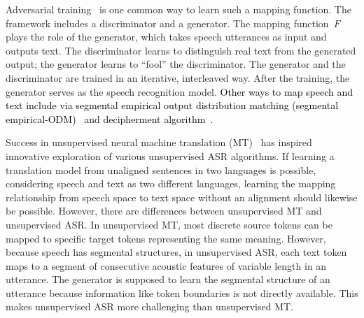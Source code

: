Adversarial training~\cite{goodfellow_generative_2014,arjovsky_wasserstein_2017, gulrajani_improved_2017} is one common way to learn such a 
mapping function. 
The framework includes a discriminator and a generator.
The mapping function~$F$ plays the role of the generator, which takes speech utterances as input and outputs text.
The discriminator learns to distinguish real text from the generated
output; the generator learns to ``fool'' the discriminator.
The generator and the discriminator are trained in an iterative, 
interleaved way. 
After the training, the generator serves as the speech recognition model.
\textcolor{black}{
Other ways to map speech and text include via segmental empirical output distribution matching (segmental empirical-ODM)~\cite{yeh_unsupervised_2019} and decipherment algorithm~\cite{klejch_deciphering_2022}.}

Success in unsupervised neural machine translation
(MT)~\cite{artetxe_unsupervised_2018, conneau_word_2018, lample_unsupervised_2018}
has inspired innovative exploration of various unsupervised ASR algorithms.
If learning a translation model from unaligned sentences in two languages is
possible, considering speech and text as two different languages, learning the
mapping relationship from speech space to text space without an alignment 
  should likewise be possible.   %
However, there are differences between unsupervised MT and unsupervised
ASR.
In unsupervised MT, most discrete source tokens can be mapped to specific
target tokens representing the same meaning. 
However, because speech has segmental structures, in unsupervised ASR, each text
token maps to a segment of consecutive acoustic features of variable length in
an utterance.
The generator is supposed to learn the segmental structure of an utterance
because information like token boundaries is not directly available.
This makes unsupervised ASR more challenging than unsupervised MT.

